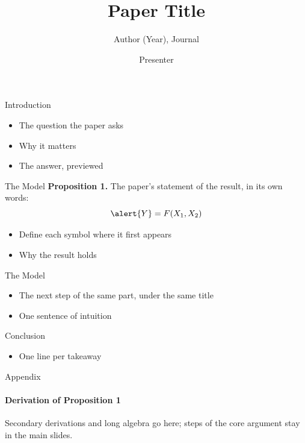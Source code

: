 \documentclass[aspectratio=169,11pt]{beamer}
\title{Paper Title}
\subtitle{Author (Year), Journal}
\author{Presenter}
\date{}
\begin{document}
\begin{frame}
  \titlepage
\end{frame}

\begin{frame}{Introduction}
  \begin{itemize}
    \item The question the paper asks
    \item Why it matters
    \item The answer, previewed
  \end{itemize}
\end{frame}

\begin{frame}[label=m-core]{The Model}
  \textbf{Proposition 1.} The paper's statement of the result, in its own words:
  \[
    \alert{Y} = F(X_1, X_2)
  \]
  \begin{itemize}
    \item Define each symbol where it first appears
    \item Why the result holds
  \end{itemize}
  \vfill\hfill\hyperlink{a-derivation}{}
\end{frame}

\begin{frame}{The Model}
  \begin{itemize}
    \item The next step of the same part, under the same title
    \item One sentence of intuition
  \end{itemize}
\end{frame}

\begin{frame}{Conclusion}
  \begin{itemize}
    \item One line per takeaway
  \end{itemize}
\end{frame}

\appendix

\begin{frame}[label=a-derivation]{Appendix}
  \framesubtitle{Derivation of Proposition 1}
  Secondary derivations and long algebra go here; steps of the core argument stay in the main slides.

  \vfill\hfill\hyperlink{m-core}{}
\end{frame}
\end{document}
